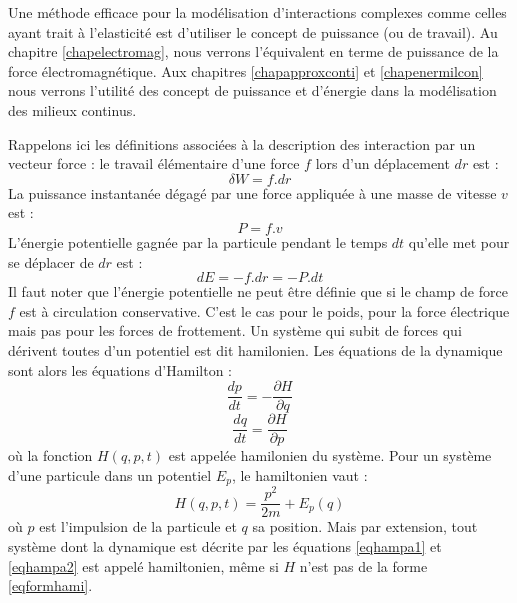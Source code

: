 \documentclass[12pt]{book}
\begin{document}
Une m\'ethode efficace pour la mod\'elisation d'interactions complexes comme
celles ayant trait \`a l'elasticit\'e est d'utiliser le concept de puissance
(ou de travail). Au chapitre \ref{chapelectromag}, nous verrons l'\'equivalent
en terme de puissance de la force \'electromagn\'etique.
Aux chapitres \ref{chapapproxconti} et \ref{chapenermilcon} nous verrons
l'utilit\'e des concept de puissance et d'\'energie dans la mod\'elisation des
milieux continus. 

Rappelons ici les d\'efinitions associ\'ees \`a la description des interaction
par un vecteur force :
le travail \'el\'ementaire d'une force $f$ lors d'un d\'eplacement $dr$ est :
\begin{equation}
\delta W=f.dr
\end{equation}
La puissance instantan\'ee d\'egag\'e par une force appliqu\'ee \`a une masse
de vitesse $v$ est :
\begin{equation}
P=f.v
\end{equation}
L'\'energie potentielle gagn\'ee par la particule pendant le temps $dt$
qu'elle met pour 
se d\'eplacer de $dr$ est :
\begin{equation}
dE=-f.dr=-P.dt
\end{equation}
Il faut noter que l'\'energie potentielle ne peut \^etre d\'efinie que si le
champ de force $f$ est \`a circulation conservative. C'est le cas pour le
poids, pour la force \'electrique mais pas pour les forces de frottement.
Un syst\`eme qui subit de forces qui d\'erivent toutes d'un potentiel est dit
hamilonien. Les \'equations de la dynamique sont alors les {\'equations
  d'Hamilton} :
\begin{equation}\label{eqhampa1}
\frac{dp}{dt}=-\frac{\partial H}{\partial q}
\end{equation}
\begin{equation}\label{eqhampa2}
\frac{dq}{dt}=\frac{\partial H}{\partial p}
\end{equation}
o\`u la fonction $H(q,p,t)$ est appel\'ee hamilonien du syst\`eme.
Pour un syst\`eme d'une particule dans un potentiel $E_p$, le hamiltonien vaut
: 
\begin{equation}\label{eqformhami}
H(q,p,t)=\frac{p^2}{2m}+E_p(q)
\end{equation}
o\`u $p$ est l'impulsion de la particule et $q$ sa position.
Mais par extension, tout syst\`eme dont la dynamique est d\'ecrite par  les
\'equations \ref{eqhampa1} et \ref{eqhampa2} est appel\'e hamiltonien,
m\^eme si $H$ n'est pas de la forme \ref{eqformhami}.
\end{document}
